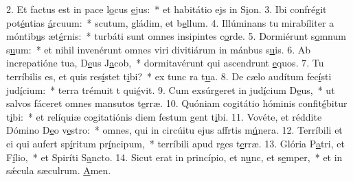 2. Et factus est in pace l\uline{o}cus \uline{e}jus:~* et habitátio ejs in S\uline{i}on.
3. Ibi confrégit pot\uline{é}ntias \uline{á}rcuum:~* scutum, gládim, et b\uline{e}llum.
4. Illúminans tu mirabíliter a móntib\uline{u}s æt\uline{é}rnis:~* turbáti sunt omnes insipintes c\uline{o}rde.
5. Dormiérunt s\uline{o}mnum s\uline{u}um:~* et nihil invenérunt omnes viri divitiárum in mánbus s\uline{u}is.
6. Ab increpatióne tua, D\uline{e}us J\uline{a}cob,~* dormitavérunt qui ascendrunt \uline{e}quos.
7. Tu terríbilis es, et quis res\uline{í}stet t\uline{i}bi?~* ex tunc ra t\uline{u}a.
8. De cælo audítum fec\uline{í}sti jud\uline{í}cium:~* terra trémuit t qui\uline{é}vit.
9. Cum exsúrgeret in jud\uline{í}cium D\uline{e}us,~* ut salvos fáceret omnes mansutos t\uline{e}rræ.
10. Quóniam cogitátio hóminis confit\uline{é}bitur t\uline{i}bi:~* et relíquiæ cogitatiónis diem festum gent t\uline{i}bi.
11. Vovéte, et réddite Dómino D\uline{e}o v\uline{e}stro:~* omnes, qui in circúitu ejus affrtis m\uline{ú}nera.
12. Terríbili et ei qui aufert sp\uline{í}ritum pr\uline{í}ncipum,~* terríbili apud rges t\uline{e}rræ.
13. Glória P\uline{a}tri, et F\uline{í}lio,~* et Spiríti S\uline{a}ncto.
14. Sicut erat in princípio, et n\uline{u}nc, et s\uline{e}mper,~* et in sǽcula sæculrum. \uline{A}men.
